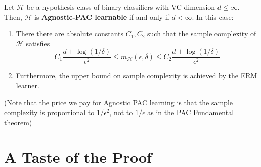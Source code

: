 \documentclass[11pt]{article}
\newcommand{\Hc}{\mathcal{H}}
\begin{document}
\begin{theorem} 
    Let $\Hc$ be a hypothesis class of
    binary classifiers with VC-dimension $d\leq \infty$. 
    Then, $\Hc$ is {\bf Agnostic-PAC learnable} if and only if $d<\infty$. In this case: 
    \begin{enumerate}
      \item   There
    there are absolute constants $C_1,C_2$
    such that the sample complexity of $\Hc$ satisfies\[ C_1
    \frac{d + \log(1/\delta)}{\epsilon^2} \le m_\Hc(\epsilon,\delta) \le
    C_2 \frac{d + \log(1/\delta)}{\epsilon^2} \]
  \item  Furthermore, the upper bound on sample complexity is achieved by the ERM learner.
    \end{enumerate}
 \end{theorem}
  (Note that the price we pay for Agnostic PAC learning is that the sample
      complexity is proportional to $1/\epsilon^2$, not to $1/\epsilon$ as in
    the PAC Fundamental theorem)



\section{A Taste of the Proof}
\end{document}
